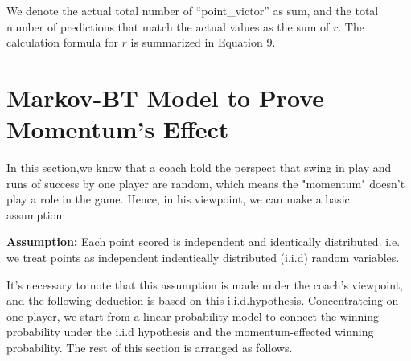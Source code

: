 \documentclass{mcmthesis}
\begin{document}
We denote the actual total number of ``point\_victor'' as sum, and the total number of predictions that match the actual values as the sum of $r$. The calculation formula for $r$ is summarized in Equation 9.











\section{Markov-BT Model to Prove Momentum's Effect}
In this section,we know that a coach hold the perspect that swing in play and runs of success by one player are random, which means the "momentum" doesn't play a role in the game. Hence, in his viewpoint, we can make a basic assumption: 
  
\noindent\textbf{Assumption:} Each point scored is independent and identically distributed. i.e. we treat points as independent indentically distributed (i.i.d) random variables.  

It's necessary to note that this assumption is made under the coach's viewpoint, and the following deduction is based on this i.i.d.hypothesis. Concentrateing on one player, we start from a linear probability model to connect the winning probability under the i.i.d hypothesis and the momentum-effected winning probability. The rest of this section is arranged as follows.   
\end{document}
